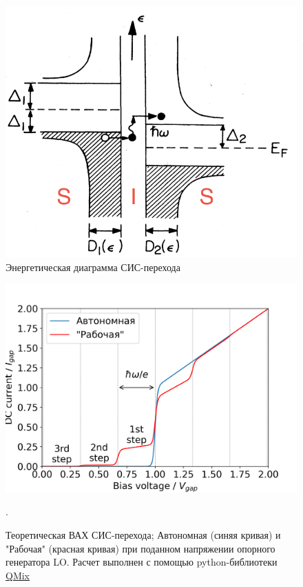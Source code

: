 \documentclass[a4paper]{article}
\begin{document}
\begin{figure}[H]
    \centering
    \includegraphics[scale=0.8]{e-diagram.png}
    \caption{Энергетическая диаграмма СИС-перехода \cite{Tucker}}
    \label{fig:e-diagram}
\end{figure}

\begin{figure}[H]
    \centering
    \includegraphics[scale=0.5]{steps.png}
    \caption{Теоретическая ВАХ СИС-перехода; Автономная (синяя кривая) и "Рабочая" (красная кривая) при поданном напряжении опорного генератора LO. Расчет выполнен с помощью python-библиотеки \href{https://github.com/garrettj403/QMix}{QMix}} \cite{Garrett}.
    \label{fig:e-steps}
\end{figure}
\end{document}
